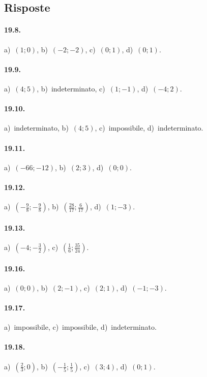 \subsection{Risposte}

\paragraph{19.8.} a)~$(1;0)$, \quad b)~$(-2;-2)$, \quad c)~$(0;1)$, \quad d)~$(0;1)$.

\paragraph{19.9.} a)~$(4;5)$, \quad b)~indeterminato, \quad c)~$(1;-1)$, \quad d)~$(-4;2)$.

\paragraph{19.10.} a)~indeterminato, \quad b)~$(4;5)$, \quad c)~impossibile, \quad d)~indeterminato.

\paragraph{19.11.} a)~$(-66;-12)$, \quad b)~$(2;3)$, \quad d)~$(0;0)$.

\paragraph{19.12.} a)~$\left(-{\frac{9}{8}};-\frac{9}{8}\right)$, \quad b)~$\left(\frac{28}{17};\frac{6}{17}\right)$, \quad d)~$(1;-3)$.

\paragraph{19.13.} a)~$\left(-4;-{\frac{3}{2}}\right)$, \quad c)~$\left(\frac{1}{6};\frac{35}{24}\right)$.

\paragraph{19.16.} a)~$(0;0)$, \quad b)~$(2;-1)$, \quad c)~$(2;1)$, \quad d)~$(-1;-3)$.

\paragraph{19.17.} a)~impossibile, \quad c)~impossibile, \quad d)~indeterminato.

\paragraph{19.18.} a)~$\left(\frac{2}{3};0\right)$, \quad b)~$\left(-{\frac{1}{5}};\frac{1}{5}\right)$, \quad c)~$(3;4)$, \quad d)~$(0;1)$.

